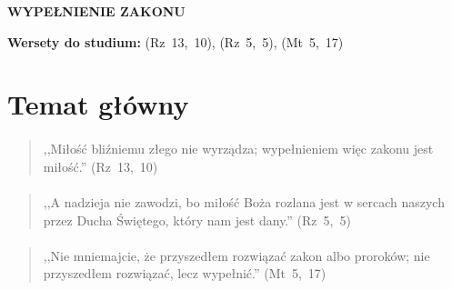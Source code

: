 \documentclass[10pt,a4paper,oneside]{article}
\begin{document}
\centerline{\textbf{\MakeUppercase{Wypełnienie zakonu}}}
\begin{center}
\textbf{Wersety do studium:} 
\mbox{(Rz 13, 10)}, \mbox{(Rz 5, 5)}, \mbox{(Mt 5, 17)}
\end{center}
\section{Temat główny}
\paragraph{}
\begin{quote}
,,Miłość bliźniemu złego nie wyrządza; wypełnieniem więc zakonu jest miłość.'' \mbox{(Rz 13, 10)}
\end{quote}
\paragraph{}
\begin{quote}
,,A nadzieja nie zawodzi, bo miłość Boża rozlana jest w sercach naszych przez Ducha Świętego, który nam jest dany.'' \mbox{(Rz 5, 5)}
\end{quote}
\paragraph{}
\begin{quote}
,,Nie mniemajcie, że przyszedłem rozwiązać zakon albo proroków; nie przyszedłem rozwiązać, lecz wypełnić.'' \mbox{(Mt 5, 17)}
\end{quote}
\end{document}
